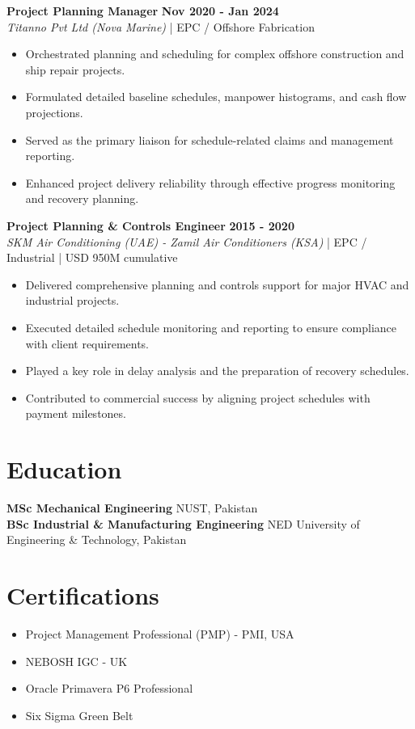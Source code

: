 \documentclass[11pt,a4paper]{article}
\begin{document}
\noindent \textbf{\large Project Planning Manager} \hfill \textbf{\color{awesome-blue}Nov 2020 - Jan 2024}\\
\textit{Titanno Pvt Ltd (Nova Marine)} | EPC / Offshore Fabrication\\
\begin{itemize}
    \item Orchestrated planning and scheduling for complex offshore construction and ship repair projects.
    \item Formulated detailed baseline schedules, manpower histograms, and cash flow projections.
    \item Served as the primary liaison for schedule-related claims and management reporting.
    \item Enhanced project delivery reliability through effective progress monitoring and recovery planning.
\end{itemize}

\noindent \textbf{\large Project Planning \& Controls Engineer} \hfill \textbf{\color{awesome-blue}2015 - 2020}\\
\textit{SKM Air Conditioning (UAE)  -  Zamil Air Conditioners (KSA)} | EPC / Industrial | USD 950M cumulative\\
\begin{itemize}
    \item Delivered comprehensive planning and controls support for major HVAC and industrial projects.
    \item Executed detailed schedule monitoring and reporting to ensure compliance with client requirements.
    \item Played a key role in delay analysis and the preparation of recovery schedules.
    \item Contributed to commercial success by aligning project schedules with payment milestones.
\end{itemize}


\section{Education}
\noindent \textbf{MSc Mechanical Engineering} \hfill NUST, Pakistan\\
\noindent \textbf{BSc Industrial \& Manufacturing Engineering} \hfill NED University of Engineering \& Technology, Pakistan\\

\section{Certifications}
\begin{itemize}[noitemsep]
    \item Project Management Professional (PMP) - PMI, USA
    \item NEBOSH IGC - UK
    \item Oracle Primavera P6 Professional
    \item Six Sigma Green Belt
\end{itemize}
\end{document}
